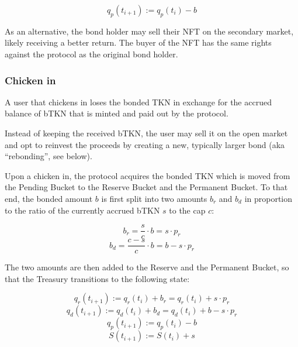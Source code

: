\documentclass{article}
\begin{document}
\begin{equation}
  \label{eq:chicken-out-transition}
    q_p(t_{i+1}) := q_p(t_i) - b
\end{equation}

As an alternative, the bond holder may sell their NFT on the secondary market, likely receiving a better return. The buyer of the NFT has the same rights against the protocol as the original bond holder.

\subsubsection{Chicken in}
\label{sec:chicken-in}
A user that chickens in loses the bonded TKN in exchange for the accrued balance of bTKN that is minted and paid out by the protocol. 

Instead of keeping the received bTKN, the user may sell it on the open market and opt to reinvest the proceeds by creating a new, typically larger bond (aka “rebonding”, see below).

Upon a chicken in, the protocol acquires the bonded TKN which is moved from the Pending Bucket to the Reserve Bucket and the Permanent Bucket. To that end, the bonded amount $b$ is first split into two amounts $b_r$ and $b_d$ in proportion to the ratio of the currently accrued bTKN $s$ to the cap $c$:

\begin{equation}
  \label{eq:chicken-in-ba}
    b_r = \frac{s}{c} \cdot b = s \cdot p_r
\end{equation}
\begin{equation}
  \label{eq:chicken-in-bd}
    b_d = \frac{c-s}{c} \cdot b = b - s \cdot p_r
\end{equation}

The two amounts are then added to the Reserve and the Permanent Bucket, so that the Treasury transitions to the following state:

\begin{equation}
  \label{eq:chicken-in-qa}
    q_r(t_{i+1}) := q_r(t_i) + b_r = q_r(t_i) + s \cdot p_r
\end{equation}
\begin{equation}
  \label{eq:chicken-in-qd}
    q_d(t_{i+1}) := q_d(t_i) + b_d = q_d(t_i) + b - s \cdot p_r
\end{equation}
\begin{equation}
  \label{eq:chicken-in-qp}
    q_p(t_{i+1}) := q_p(t_i) - b
\end{equation}
\begin{equation}
  \label{eq:chicken-in-S}
    S(t_{i+1}) := S(t_i) + s
\end{equation}
\end{document}
